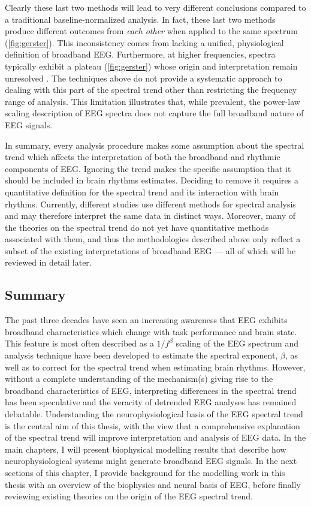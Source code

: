 Clearly these last two methods will lead to very different conclusions compared to a traditional baseline-normalized analysis. In fact, these last two methods produce different outcomes from \textit{each other} when applied to the same spectrum (\autoref{fig:gerster}). This inconsistency comes from lacking a unified, physiological definition of broadband EEG. Furthermore, at higher frequencies, spectra typically exhibit a plateau  (\autoref{fig:gerster}) whose origin and interpretation remain unresolved \cite{Gerster2022}. The techniques above do not provide a systematic approach to dealing with this part of the spectral trend other than restricting the frequency range of analysis. This limitation illustrates that, while prevalent, the power-law scaling description of EEG spectra does not capture the full broadband nature of EEG signals. 

In summary, every analysis procedure makes some assumption about the spectral trend which affects the interpretation of both the broadband and rhythmic components of EEG. Ignoring the trend makes the specific assumption that it should be included in brain rhythms estimates. Deciding to remove it requires a quantitative definition for the spectral trend and its interaction with brain rhythms. Currently, different studies use different methods for spectral analysis and may therefore interpret the same data in distinct ways. Moreover, many of the theories on the spectral trend do not yet have quantitative methods associated with them, and thus the methodologies described above only reflect a subset of the existing interpretations of broadband EEG --- all of which will be reviewed in detail later.

\subsection{Summary}
The past three decades have seen an increasing awareness that EEG exhibits broadband characteristics which change with task performance and brain state. This feature is most often described as a $1/f^\beta$ scaling of the EEG spectrum and analysis technique have been developed to estimate the spectral exponent, $\beta$, as well as to correct for the spectral trend when estimating brain rhythms. However, without a complete understanding of the mechanism(s) giving rise to the broadband characteristics of EEG, interpreting differences in the spectral trend has been speculative and the veracity of detrended EEG analyses has remained debatable. Understanding the neurophysiological basis of the EEG spectral trend is the central aim of this thesis, with the view that a comprehensive explanation of the spectral trend will improve interpretation and analysis of EEG data. In the main chapters, I will present biophysical modelling results that describe how neurophysiological systems might generate broadband EEG signals. In the next sections of this chapter, I provide background for the modelling work in this thesis with an overview of the biophysics and neural basis of EEG, before finally reviewing existing theories on the origin of the EEG spectral trend.

